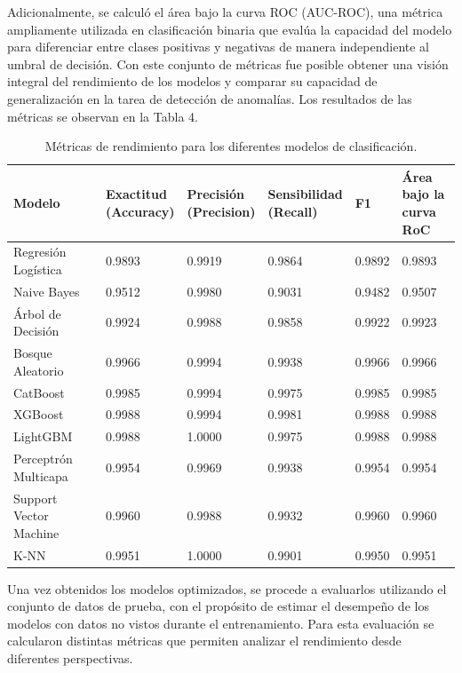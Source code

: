 \documentclass[11pt,a4paper,spanish]{book}
\numberwithin{equation}{chapter}
\numberwithin{figure}{chapter}
\begin{document}
Adicionalmente, se calculó el área bajo la curva ROC (AUC-ROC), una métrica ampliamente utilizada en clasificación binaria que evalúa la capacidad del modelo para diferenciar entre clases positivas y negativas de manera independiente al umbral de decisión. Con este conjunto de métricas fue posible obtener una visión integral del rendimiento de los modelos y comparar su capacidad de generalización en la tarea de detección de anomalías. Los resultados de las métricas se observan en  la Tabla 4. 


\begin{table}[h]
\centering
\begin{tabular}{|l|p{2.5cm}|p{2.5cm}|p{2.5cm}|p{1.5cm}|p{2.5cm}|}
\hline
\textbf{Modelo} & 
\centering \textbf{Exactitud \\ (Accuracy)} & 
\centering \textbf{Precisión \\ (Precision)} & 
\centering \textbf{Sensibilidad \\ (Recall)} & 
\centering \textbf{F1} & 
\centering \textbf{Área bajo la \\ curva RoC} \tabularnewline
\hline
Regresión Logística & 0.9893 & 0.9919 & 0.9864 & 0.9892 & 0.9893 \\
\hline
Naive Bayes & 0.9512 & 0.9980 & 0.9031 & 0.9482 & 0.9507 \\
\hline
Árbol de Decisión & 0.9924 & 0.9988 & 0.9858 & 0.9922 & 0.9923 \\
\hline
Bosque Aleatorio & 0.9966 & 0.9994 & 0.9938 & 0.9966 & 0.9966 \\
\hline
CatBoost & 0.9985 & 0.9994 & 0.9975 & 0.9985 & 0.9985 \\
\hline
XGBoost & 0.9988 & 0.9994 & 0.9981 & 0.9988 & 0.9988 \\
\hline
LightGBM & 0.9988 & 1.0000 & 0.9975 & 0.9988 & 0.9988 \\
\hline
Perceptrón Multicapa & 0.9954 & 0.9969 & 0.9938 & 0.9954 & 0.9954 \\
\hline
Support Vector Machine & 0.9960 & 0.9988 & 0.9932 & 0.9960 & 0.9960 \\
\hline
K-NN & 0.9951 & 1.0000 & 0.9901 & 0.9950 & 0.9951 \\
\hline
\end{tabular}
\caption{Métricas de rendimiento para los diferentes modelos de clasificación.}
\label{tab:metricas_modelos}
\end{table}


Una vez obtenidos los modelos optimizados, se procede a evaluarlos utilizando el conjunto de datos de prueba, con el propósito de estimar el desempeño de los modelos con datos no vistos durante el entrenamiento. Para esta evaluación se calcularon distintas métricas que permiten analizar el rendimiento desde diferentes perspectivas. 
\end{document}
